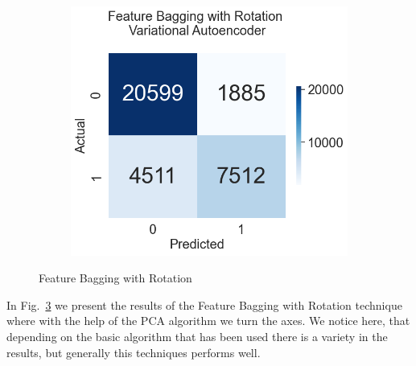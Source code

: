 \documentclass[a4paper,12pt]{report}
\theoremstyle{definitionNODot}
\begin{document}
\begin{figure}[H]
\begin{subfigure}[b]{0.35\textwidth}
			\label{fig:anomaly_by_ensemble_ensemble_rotation_lstm_ae}
		\end{subfigure}
		\medskip
		\begin{subfigure}[b]{0.35\textwidth}
			\centering
			\includegraphics[width=\textwidth]{anomaly_by_ensemble_ensemble_rotation_lstm_vae.png}
			
			\label{fig:anomaly_by_ensemble_ensemble_rotation_lstm_vae}
		\end{subfigure}
		\caption{Feature Bagging with Rotation}
		\label{fig:featurebaggingwithrotationmodelsconfusion}
	\end{figure}
	
	In Fig.~\ref{fig:featurebaggingwithrotationmodelsconfusion} we present the results of the Feature Bagging with Rotation technique where with the help of the PCA algorithm we turn the axes. We notice here, that depending on the basic algorithm that has been used there is a variety in the results, but generally this techniques performs well.
	
\end{document}

